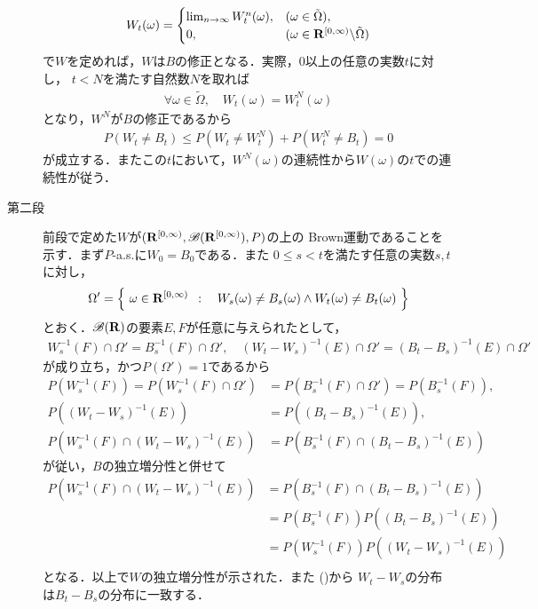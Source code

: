 \begin{prf}
\begin{description}
\begin{align}
					W_t(\omega) = 
					\begin{cases}
						\lim_{n \to \infty} W^n_t(\omega), & (\omega \in \tilde{\Omega}), \\
						0, & (\omega \in \mathbf{R}^{[0,\infty)} \backslash \tilde{\Omega})
					\end{cases}
				\end{align}
				で$W$を定めれば，$W$は$B$の修正となる．実際，0以上の任意の実数$t$に対し，
				$t < N$を満たす自然数$N$を取れば
				\begin{align}
					\forall \omega \in \tilde{\Omega},\quad 
					W_t(\omega) = W^N_t(\omega)
				\end{align}
				となり，$W^N$が$B$の修正であるから
				\begin{align}
					P(W_t \neq B_t) \leq P(W_t \neq W^N_t) + P(W^N_t \neq B_t) = 0
				\end{align}
				が成立する．またこの$t$において，$W^N(\omega)$の連続性から$W(\omega)$の$t$での連続性が従う．
				
			\item[第二段]
				前段で定めた$W$が$(\mathbf{R}^{[0,\infty)},\mathscr{B}(\mathbf{R}^{[0,\infty)}),P)$の上の
				Brown運動であることを示す．まず$P$-a.s.に$W_0 = B_0$である．また
				$0 \leq s < t$を満たす任意の実数$s,t$に対し，
				\begin{align}
					\Omega' = \left\{\ \omega \in \mathbf{R}^{[0,\infty)}\ \, : \quad W_s(\omega) \neq B_s(\omega) \wedge W_t(\omega) \neq B_t(\omega)\ \right\}
				\end{align}
				とおく．$\mathscr{B}(\mathbf{R})$の要素$E,F$が任意に与えられたとして，
				\begin{align}
					W_s^{-1}(F) \cap \Omega' = B_s^{-1}(F) \cap \Omega',
					\quad
					(W_t-W_s)^{-1}(E) \cap \Omega' = (B_t-B_s)^{-1}(E) \cap \Omega'
				\end{align}
				が成り立ち，かつ$P(\Omega') = 1$であるから
				\begin{align}
					P\left( W_s^{-1}(F) \right)
					= P\left( W_s^{-1}(F) \cap \Omega' \right)
					&= P\left( B_s^{-1}(F) \cap \Omega' \right)
					= P\left( B_s^{-1}(F) \right), \\
					P\left( (W_t-W_s)^{-1}(E) \right) &= P\left( (B_t-B_s)^{-1}(E) \right), \label{eq:chapter_2_Corollary_to_Theorem_2_8} \\
					P\left( W_s^{-1}(F) \cap (W_t-W_s)^{-1}(E) \right)
					&= P\left( B_s^{-1}(F) \cap (B_t-B_s)^{-1}(E) \right)
				\end{align}
				が従い，$B$の独立増分性と併せて
				\begin{align}
					P\left( W_s^{-1}(F) \cap (W_t-W_s)^{-1}(E) \right)
					&= P\left( B_s^{-1}(F) \cap (B_t-B_s)^{-1}(E) \right) \\
					&= P\left( B_s^{-1}(F) \right) P\left( (B_t-B_s)^{-1}(E) \right) \\
					&= P\left( W_s^{-1}(F) \right) P\left( (W_t-W_s)^{-1}(E) \right) \\
				\end{align}
				となる．以上で$W$の独立増分性が示された．また
				()から
				$W_t-W_s$の分布は$B_t-B_s$の分布に一致する．
				\QED
		\end{description}
	\end{prf}